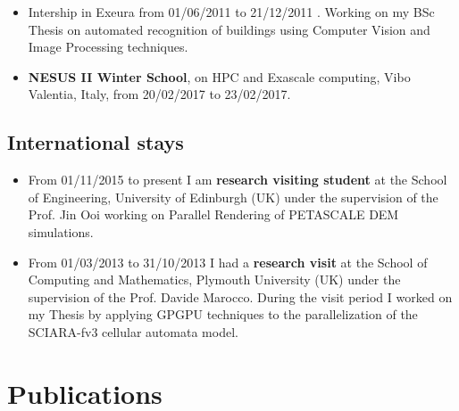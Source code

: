 \documentclass[a4paper,10pt]{article}
\begin{document}
\begin{itemize}
\item Intership in Exeura from 01/06/2011 to 21/12/2011 .
Working on my BSc Thesis on automated recognition of buildings using Computer Vision and Image Processing techniques.

\item \textbf{NESUS II Winter School}, on HPC and Exascale computing, Vibo Valentia, Italy, from 20/02/2017 to 23/02/2017.  
\end{itemize}


\subsection{International stays}


\begin{itemize}
 \item From 01/11/2015 to present I am \textbf{research visiting student} at the
School of Engineering, University of Edinburgh (UK) under the
supervision of the Prof. Jin Ooi working on Parallel Rendering of PETASCALE DEM
simulations.

\item From 01/03/2013 to 31/10/2013 I had a \textbf{research visit} at the
School of Computing and Mathematics, Plymouth University (UK) under the
supervision of the Prof. Davide Marocco.
During the visit period I worked on my  Thesis by applying GPGPU techniques to
the parallelization of the SCIARA-fv3 cellular automata model.
\end{itemize}


\begin{center}
\mbox{}
\end{center}

\section{Publications}
\end{document}
